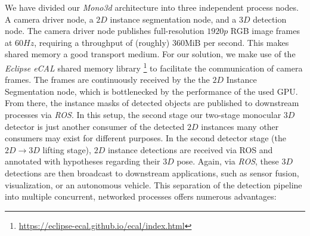 We have divided our \textit{Mono3d} architecture into three independent process nodes.
A camera driver node, a $2D$ instance segmentation node, and a $3D$ detection node.
The camera driver node publishes full-resolution $1920p$ RGB image frames at $60Hz$, requiring a throughput of (roughly) $360 \text{MiB}$ per second.
This makes shared memory a good transport medium.
For our solution, we make use of the \textit{Eclipse eCAL} shared memory library \footnote{\hyperlink{https://eclipse-ecal.github.io/ecal/index.html}{https://eclipse-ecal.github.io/ecal/index.html}} to facilitate the communication of camera frames.
The frames are continuously received by the the $2D$ Instance Segmentation node, which is bottlenecked by the performance of the used GPU.
From there, the instance masks of detected objects are published to downstream processes via \textit{ROS}.
In this setup, the second stage our two-stage monocular $3D$ detector is just another consumer of the detected $2D$ instances \textemdash many other consumers may exist for different purposes.
In the second detector stage (the $2D \rightarrow 3D$ lifting stage), $2D$ instance detections are received via ROS and annotated with hypotheses regarding their $3D$ pose.
Again, via \textit{ROS}, these $3D$ detections are then broadcast to downstream applications, such as sensor fusion, visualization, or an autonomous vehicle.
This separation of the detection pipeline into multiple concurrent, networked processes offers numerous advantages:

